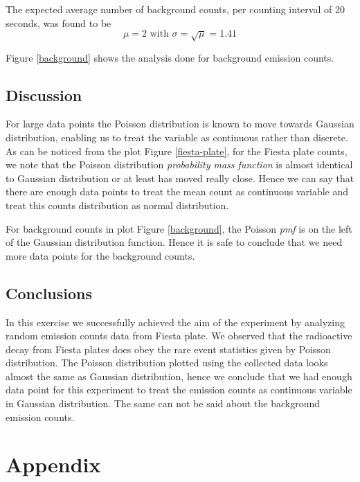 \documentclass[letterpaper,12pt]{article}
\begin{document}
The expected average number of background counts, per counting interval of 20 seconds, was found to be
$$\mu=2\text{\ \ \ \ with \ \ \ } \sigma = \sqrt{\mu} = 1.41$$

Figure \ref{background} shows the analysis done for background emission counts.

\subsection{Discussion}

For large data points the Poisson distribution is known to move towards Gaussian distribution, enabling 
us to treat the variable as continuous rather than discrete. As can be noticed from the plot Figure \ref{fiesta-plate}, 
for the Fiesta plate counts, we note that the Poisson distribution \emph{probability mass function}
is almost identical to Gaussian distribution or at least has moved really close. Hence we can say that there 
are enough data points to treat the mean count as continuous variable and treat this counts distribution as normal distribution. 

For background counts in plot Figure \ref{background}, the Poisson \emph{pmf} is on the left of the Gaussian distribution function. Hence it is safe
to conclude that we need more data points for the background counts.

\subsection{Conclusions}
In this exercise we successfully achieved the aim of the experiment by analyzing random emission counts data
from Fiesta plate. We observed that the radioactive decay from Fiesta plates does obey 
the rare event statistics given by Poisson distribution. The Poisson distribution plotted using the 
collected data looks almost the same as Gaussian distribution, hence we conclude that we had enough 
data point for this experiment to treat the emission counts as continuous variable in  Gaussian distribution. 
The same can not be said about the background emission counts.

\pagebreak

\appendix

\section{Appendix}
\end{document}
